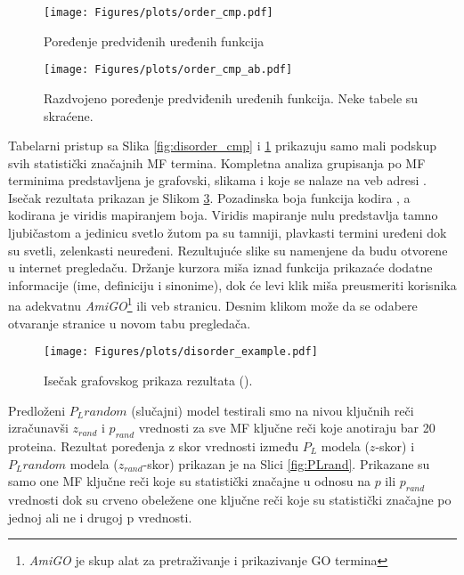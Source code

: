 

\begin{figure}[th]
\hspace*{-2.0cm} 
\texttt{[image: Figures/plots/order\_cmp.pdf]}
\decoRule
\caption {
  Poređenje predviđenih uređenih funkcija
}
\label{fig:order_cmp}
\end{figure}

\begin{figure}[th]
\hspace*{-0.5cm} 
\texttt{[image: Figures/plots/order\_cmp\_ab.pdf]}
\decoRule
\caption {
  Razdvojeno poređenje predviđenih uređenih funkcija. Neke tabele su skraćene.
}
\label{fig:order_cmp_ab}
\end{figure}


\clearpage

Tabelarni pristup sa Slika \ref{fig:disorder_cmp} i \ref{fig:order_cmp}
prikazuju samo mali podskup svih statistički značajnih MF termina.  Kompletna
analiza grupisanja po MF terminima predstavljena je grafovski, slikama
 i  koje se nalaze na veb adresi
\cite{rezultati}.  Isečak rezultata  prikazan
je Slikom \ref{fig:disorder_example}.  Pozadinska boja funkcija kodira
, a kodirana je viridis \cite{viridis} mapiranjem
boja. Viridis mapiranje nulu predstavlja tamno ljubičastom a jedinicu svetlo
žutom pa su tamniji, plavkasti termini  uređeni dok su svetli, zelenkasti
neuređeni.  Rezultujuće  slike su namenjene da budu otvorene u
internet pregledaču.  Držanje kurzora miša iznad funkcija prikazaće dodatne
informacije (ime, definiciju i sinonime), dok će levi klik miša preusmeriti
korisnika na adekvatnu \textit{AmiGO}\footnote{\textit{AmiGO} je skup alat za
pretraživanje i prikazivanje GO termina } ili \uniprot veb stranicu. Desnim
klikom može da se odabere otvaranje stranice u novom tabu pregledača.

\begin{figure}[th]
\hspace*{-2.0cm} 
\texttt{[image: Figures/plots/disorder\_example.pdf]}
\caption {
  Isečak grafovskog prikaza rezultata ().
}
\label{fig:disorder_example}
\end{figure}


Predloženi $P_L random$ (slučajni) model testirali smo na nivou ključnih reči
izračunavši $z_{rand}$ i  $p_{rand}$ vrednosti za sve MF ključne reči koje
anotiraju bar 20 proteina. Rezultat poređenja z skor vrednosti između $P_L$
modela ($z$-skor) i $P_L random$ modela ($z_{rand}$-skor) prikazan je na Slici
\ref{fig:PLrand}. Prikazane su samo one MF ključne reči koje su statistički
značajne u odnosu na $p$ ili $p_{rand}$ vrednosti dok su crveno obeležene one
ključne reči koje su statistički značajne po jednoj ali ne i drugoj p
vrednosti.


